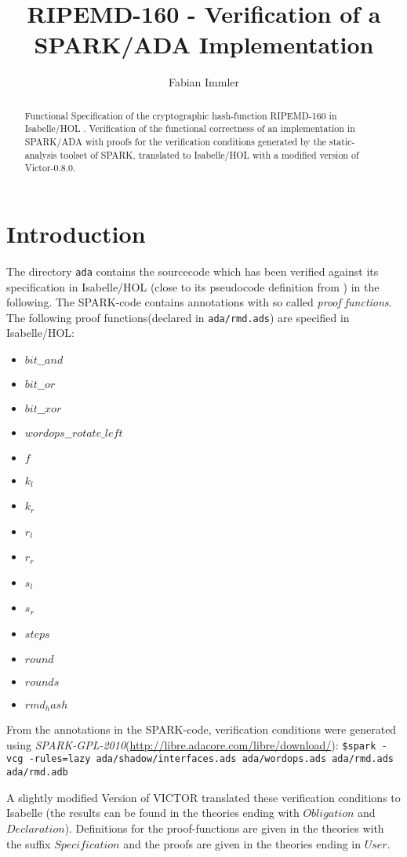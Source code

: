 \documentclass[11pt,a4paper]{article}
\begin{document}
\title{RIPEMD-160 - Verification of a SPARK/ADA Implementation}
\author{Fabian Immler}
\maketitle

\begin{abstract}
  Functional Specification of the cryptographic hash-function RIPEMD-160
  \cite{ripemd} in Isabelle/HOL \cite{LNCS2283}. Verification of the functional
  correctness of an implementation in SPARK/ADA \cite{highintegritysoftware}
  with proofs for the verification conditions generated by the static-analysis
  toolset of SPARK, translated to Isabelle/HOL with
  a modified version of Victor-0.8.0\cite{vct}.
\end{abstract}

\tableofcontents

\section{Introduction}

The directory \texttt{ada} contains the sourcecode which has been verified
against its specification in Isabelle/HOL (close to its pseudocode definition
from \cite{ripemd}) in the following.  The SPARK-code contains annotations with
so called \emph{proof functions}. The following proof functions(declared in
\texttt{ada/rmd.ads}) are specified in Isabelle/HOL:
\begin{itemize}
\item $bit\_\_and$
\item $bit\_\_or$
\item $bit\_\_xor$
\item $wordops\_\_rotate\_left$
\item $f$
\item $k_l$
\item $k_r$
\item $r_l$
\item $r_r$
\item $s_l$
\item $s_r$
\item $steps$
\item $round$
\item $rounds$
\item $rmd_hash$
\end{itemize}

From the annotations in the SPARK-code, verification conditions were generated
using \emph{SPARK-GPL-2010}(\url{http://libre.adacore.com/libre/download/}):
\texttt{\$spark -vcg -rules=lazy ada/shadow/interfaces.ads ada/wordops.ads
  ada/rmd.ads ada/rmd.adb}

A slightly modified Version of VICTOR \cite{vct} translated these verification
conditions to Isabelle (the results can be found in the theories ending with
$Obligation$ and $Declaration$). Definitions for the proof-functions are given
in the theories with the suffix $Specification$ and the proofs are given in the
theories ending in $User$.






\end{document}
